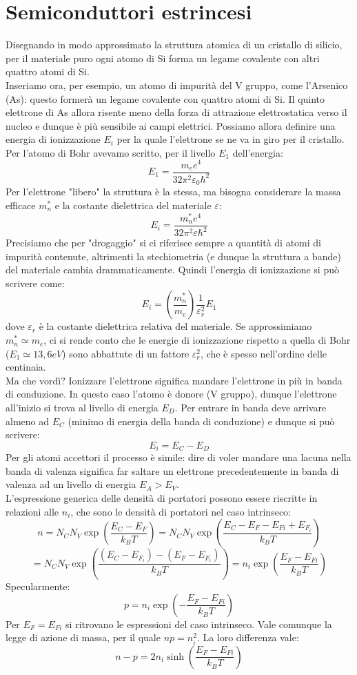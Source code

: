 \documentclass{book}
\begin{document}
    \section{Semiconduttori estrincesi}
        Disegnando in modo approssimato la struttura atomica di un cristallo di silicio, per il materiale puro ogni atomo di Si forma un legame covalente con altri quattro atomi di Si.\\
        Inseriamo ora, per esempio, un atomo di impurità del V gruppo, come l'Arsenico (As): questo formerà un legame covalente con quattro atomi di Si. Il quinto elettrone di As allora risente meno della forza di attrazione elettrostatica verso il nucleo e dunque è più sensibile ai campi elettrici. Possiamo allora definire una energia di ionizzazione $E_{i}$ per la quale l'elettrone se ne va in giro per il cristallo. Per l'atomo di Bohr avevamo scritto, per il livello $E_{1}$ dell'energia:
        $$E_{1} = \frac{m_{e}e^{4}}{32 \pi ^{2}\varepsilon_{0} \hbar ^{2}}$$
        Per l'elettrone "libero" la struttura è la stessa, ma bisogna considerare la massa efficace $m^{*}_{n}$ e la costante dielettrica del materiale $\varepsilon$:
        $$E_{i} = \frac{m_{n} ^{*}e^{4}}{32 \pi ^{2}\varepsilon \hbar^{2}}$$
        Precisiamo che per "drogaggio" si ci riferisce sempre a quantità di atomi di impurità contenute, altrimenti la stechiometria (e dunque la struttura a bande) del materiale cambia drammaticamente.
        Quindi l'energia di ionizzazione si può scrivere come:
        $$E_{i} = (\frac{m_{n} ^{*}}{m_{e}})\frac{1}{\varepsilon_{r} ^{2}}E_{1}$$
        dove $\varepsilon_{r}$ è la costante dielettrica relativa del materiale.
        Se approssimiamo $m_{n} ^{*} \simeq m_{e}$, ci si rende conto che le energie di ionizzazione rispetto a quella di Bohr ($E_{1} \simeq 13,6eV$) sono abbattute di un fattore $\varepsilon_{r} ^{2}$, che è spesso nell'ordine delle centinaia.\\
        Ma che vordì? Ionizzare l'elettrone significa mandare l'elettrone in più in banda di conduzione. In questo caso l'atomo è donore (V gruppo), dunque l'elettrone all'inizio si trova al livello di energia $E_{D}$. Per entrare in banda deve arrivare almeno ad $E_{C}$ (minimo di energia della banda di conduzione) e dunque si può scrivere:
        $$E_{i} = E_{C} - E_{D}$$
        Per gli atomi accettori il processo è simile: dire di voler mandare una lacuna nella banda di valenza significa far saltare un elettrone precedentemente in banda di valenza ad un livello di energia $E_{A}>E_{V}$.\\
        L'espressione generica delle densità di portatori possono essere riscritte in relazioni alle $n_{i}$, che sono le densità di portatori nel caso intrinseco:
        $$n = N_{C}N_{V}\exp{(\frac{E_{C}-E_{F}}{k_{B}T})} = N_{C}N_{V}\exp{(\frac{E_{C}-E_{F} - E_{Fi} +E_{F_{i}}}{k_{B}T})}$$
        $$= N_{C}N_{V}\exp{(\frac{(E_{C}-E_{F_{i}})-(E_{F}-E_{F_{i}})}{k_{B}T})} = n_{i}\exp{(\frac{E_{F}-E_{Fi}}{k_{B}T})}$$
        Specularmente:
        $$p = n_{i}\exp{(-\frac{E_{F}-E_{Fi}}{k_{B}T})}$$
        Per $E_{F} = E_{Fi}$ si ritrovano le espressioni del caso intrinseco. Vale comunque la legge di azione di massa, per il quale $np = n_{i} ^{2}$. La loro differenza vale:
        $$n-p = 2n_{i}\sinh{(\frac{E_{F}-E_{Fi}}{k_{B}T})}$$
\end{document}
